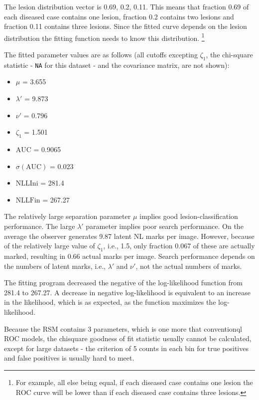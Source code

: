 \documentclass[
]{book}
\providecommand{\tightlist}{%
  \setlength{\itemsep}{0pt}\setlength{\parskip}{0pt}}
\begin{document}
The lesion distribution vector is 0.69, 0.2, 0.11. This means that fraction 0.69 of each diseased case contains one lesion, fraction 0.2 contains two lesions and fraction 0.11 contains three lesions. Since the fitted curve depends on the lesion distribution the fitting function needs to know this distribution. \footnote{For example, all else being equal, if each diseased case contains one lesion the ROC curve will be lower than if each diseased case contains three lesions.}

The fitted parameter values are as follows (all cutoffs excepting \(\zeta_1\), the chi-square statistic - \texttt{NA} for this dataset - and the covariance matrix, are not shown):

\begin{itemize}
\tightlist
\item
  \(\mu\) = 3.655
\item
  \(\lambda'\) = 9.873
\item
  \(\nu'\) = 0.796
\item
  \(\zeta_1\) = 1.501
\item
  \(\text{AUC}\) = 0.9065
\item
  \(\sigma (\text{AUC})\) = 0.023
\item
  \(\text{NLLIni}\) = 281.4
\item
  \(\text{NLLFin}\) = 267.27
\end{itemize}

The relatively large separation parameter \(\mu\) implies good lesion-classification performance. The large \(\lambda'\) parameter implies poor search performance. On the average the observer generates 9.87 latent NL marks per image. However, because of the relatively large value of \(\zeta_1\), i.e., 1.5, only fraction 0.067 of these are actually marked, resulting in 0.66 actual marks per image. Search performance depends on the numbers of latent marks, i.e., \(\lambda'\) and \(\nu'\), not the actual numbers of marks.

The fitting program decreased the negative of the log-likelihood function from 281.4 to 267.27. A decrease in negative log-likelihood is equivalent to an increase in the likelihood, which is as expected, as the function maximizes the log-likelihood.

Because the RSM contains 3 parameters, which is one more that conventionql ROC models, the chisquare goodness of fit statistic usually cannot be calculated, except for large datasets - the criterion of 5 counts in each bin for true positives and false positives is usually hard to meet.
\end{document}
